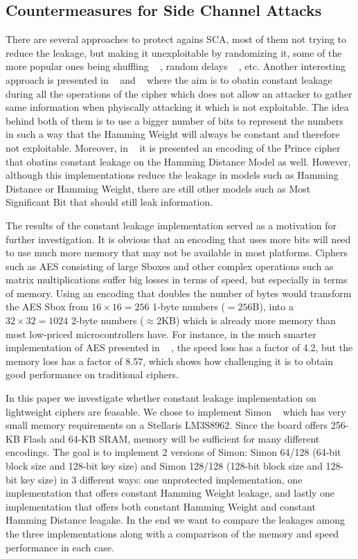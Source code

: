 \documentclass[conference]{IEEEtran}
\begin{document}
\subsection{Countermeasures for Side Channel Attacks}

There are several approaches to protect agains SCA, most of them not trying to reduce the leakage, but making it unexploitable by randomizing it, some of the more popular ones being shuffling ~\cite{WangShuffling} , random delays ~\cite{CoronRandomDelays} , etc. Another interesting approach is presented in ~\cite{BEPrince} and ~\cite{ServantAES} where the aim is to obatin constant leakage during all the operations of the cipher which does not allow an attacker to gather same information when phyiscally attacking it which is not exploitable. The idea behind both of them is to use a bigger number of bits to represent the numbers in such a way that the Hamming Weight will always be constant and therefore not exploitable. Moreover, in ~\cite{BEPrince} it is presented an encoding of the Prince cipher that obatins constant leakage on the Hamming Distance Model as well. However, although this implementations reduce the leakage in models such as Hamming Distance or Hamming Weight, there are still other models such as Most Significant Bit that should still leak information.

The results of the constant leakage implementation served as a motivation for further investigation. It is obvious that an encoding that uses more bits will need to use much more memory that may not be available in most platforms. Ciphers such as AES consisting of large Sboxes and other complex operations such as matrix multiplications suffer big losses in terms of speed, but especially in terms of memory. Using an encoding that doubles the number of bytes would transform the AES Sbox from $16 \times 16 = 256$ 1-byte numbers ($=256$B), into a $32 \times 32 = 1024$ 2-byte numbers ($\approx2$KB) which is already more memory than most low-priced microcontrollers have. For instance, in the much smarter implementation of AES presented in ~\cite{ServantAES} , the speed loss has a factor of 4.2, but the memory loss has a factor of 8.57, which shows how challenging it is to obtain good performance on traditional ciphers.

In this paper we investigate whether constant leakage implementation on lightweight ciphers are feasable. We chose to implement Simon ~\cite{Beaulieu_Simon} which has very small memory requirements on a Stellaris LM3S8962. Since the board offers 256-KB Flash and 64-KB SRAM, memory will be sufficient for many different encodings. The goal is to implement 2 versions of Simon: Simon 64/128 (64-bit block size and 128-bit key size) and Simon 128/128 (128-bit block size and 128-bit key size) in 3 different ways: one unprotected implementation, one implementation that offers constant Hamming Weight leakage, and lastly one implementation that offers both constant Hamming Weight and constant Hamming Distance leagake. In the end we want to compare the leakages among the three implementations along with a comparrison of the memory and speed performance in each case.
\end{document}
